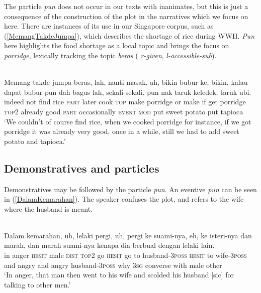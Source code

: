 \documentclass[output=paper
,modfonts
,nonflat]{langsci/langscibook}
\begin{document}
\noindent
The particle \emph{pun} does not occur in our texts with inanimates, but this is just a consequence of the construction of the plot in the narratives which we focus on here. There are instances of its use in our Singapore  corpus, such as (\ref{MemangTakdeJumpa}), which describes the shortage of rice during WWII. \emph{Pun} here highlights the food shortage as a local topic and brings the focus on \emph{porridge}, lexically tracking the topic \emph{beras} ( \emph{r-given}, \emph{l-accessible-sub}).

\ea\label{MemangTakdeJumpa} 
\\
\gll 	Memang    takde      jumpa beras, lah, nanti masak, ah,   bikin bubur    ke,  bikin, kalau dapat bubur    pun  dah     bagus lah, sekali-sekali, pun  nak  taruk keledek,     taruk ubi.\\
indeed not find  rice   \textsc{part}  later cook   \textsc{top} make  porridge or   make   if    get porridge \textsc{top2} already good  \textsc{part}  occasionally   \textsc{event} \textsc{mod} put   sweet potato put   tapioca\\
\glt `We couldn't of course find rice, when we cooked porridge for instance, if we got porridge it was already
very good, once in a while, still we had to add sweet potato and tapioca.'
\z

\subsection{Demonstratives and particles}\label{GivenDemPart}
Demonstratives may be followed by the particle \emph{pun}. An eventive \emph{pun} can be seen in (\ref{DalamKemarahan}). The speaker confuses the plot, and refers to the wife where the husband is meant.

\ea\label{DalamKemarahan} 
\\
\gll Dalam kemarahan, uh,    {\ob}lelaki    pergi, uh,   pergi ke   suami-nya,      eh,   ke   isteri-nya dan  marah, dan  marah suami-nya      kenapa dia berbual  dengan lelaki lain.\\
in    anger      \textsc{hesit} male   \textsc{dist} \textsc{top2} go     \textsc{hesit} go    to   husband-\textsc{3poss} \textsc{hesit} to   wife-\textsc{3poss} and  angry  and  angry husband-\textsc{3poss} why    \textsc{3sg} converse with   male   other\\
\glt `In anger, that man then went to his wife and scolded his husband [sic] for talking to other men.'
\z
\end{document}
